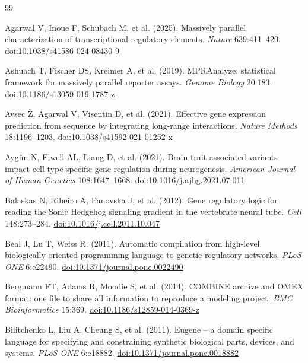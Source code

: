 \begin{thebibliography}{99}
\setlength{\itemsep}{2pt}

 Agarwal V, Inoue F, Schubach M, et al. (2025). Massively parallel characterization of transcriptional regulatory elements. \textit{Nature} 639:411–420. \href{https://doi.org/10.1038/s41586-024-08430-9}{doi:10.1038/s41586-024-08430-9}

 Ashuach T, Fischer DS, Kreimer A, et al. (2019). MPRAnalyze: statistical framework for massively parallel reporter assays. \textit{Genome Biology} 20:183. \href{https://doi.org/10.1186/s13059-019-1787-z}{doi:10.1186/s13059-019-1787-z}

 Avsec Ž, Agarwal V, Visentin D, et al. (2021). Effective gene expression prediction from sequence by integrating long-range interactions. \textit{Nature Methods} 18:1196–1203. \href{https://doi.org/10.1038/s41592-021-01252-x}{doi:10.1038/s41592-021-01252-x}

 Aygün N, Elwell AL, Liang D, et al. (2021). Brain-trait-associated variants impact cell-type-specific gene regulation during neurogenesis. \textit{American Journal of Human Genetics} 108:1647–1668. \href{https://doi.org/10.1016/j.ajhg.2021.07.011}{doi:10.1016/j.ajhg.2021.07.011}

 Balaskas N, Ribeiro A, Panovska J, et al. (2012). Gene regulatory logic for reading the Sonic Hedgehog signaling gradient in the vertebrate neural tube. \textit{Cell} 148:273–284. \href{https://doi.org/10.1016/j.cell.2011.10.047}{doi:10.1016/j.cell.2011.10.047}

 Beal J, Lu T, Weiss R. (2011). Automatic compilation from high-level biologically-oriented programming language to genetic regulatory networks. \textit{PLoS ONE} 6:e22490. \href{https://doi.org/10.1371/journal.pone.0022490}{doi:10.1371/journal.pone.0022490}

 Bergmann FT, Adams R, Moodie S, et al. (2014). COMBINE archive and OMEX format: one file to share all information to reproduce a modeling project. \textit{BMC Bioinformatics} 15:369. \href{https://doi.org/10.1186/s12859-014-0369-z}{doi:10.1186/s12859-014-0369-z}

 Bilitchenko L, Liu A, Cheung S, et al. (2011). Eugene – a domain specific language for specifying and constraining synthetic biological parts, devices, and systems. \textit{PLoS ONE} 6:e18882. \href{https://doi.org/10.1371/journal.pone.0018882}{doi:10.1371/journal.pone.0018882}


\end{thebibliography}
